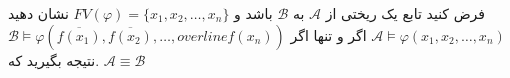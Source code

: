 فرض کنید
تابع یک ریختی از 
$\mathcal{A}$
به 
$\mathcal{B}$
باشد و 
$FV(\varphi) = \{x_{1}, x_{2},\dots, x_{n}\}$
نشان دهید 
$\mathcal{A}\models\varphi(x_{1},x_{2},\dots, x_{n})$
اگر و تنها اگر 
$\mathcal{B}\models\varphi(\overline{f(x_{1})},\overline{f(x_{2})},\dots,overline{f(x_{n})})$
.نتیجه بگیرید که 
$\mathcal{A}\equiv\mathcal{B}$
